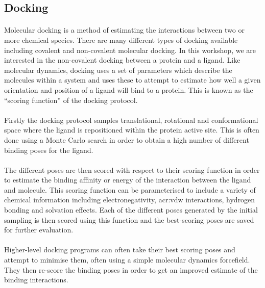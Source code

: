 \subsection{Docking}
    \paragraph{}
        Molecular docking is a method of estimating the interactions between two or more chemical species. There are many different types of docking available including covalent and non-covalent molecular docking. In this workshop, we are interested in the non-covalent docking between a protein and a ligand. Like molecular dynamics, docking uses a set of parameters which describe the molecules within a system and uses these to attempt to estimate how well a given orientation and position of a ligand will bind to a protein. This is known as the \enquote{scoring function} of the docking protocol. 
        
    \paragraph{}
Firstly the docking protocol samples translational, rotational and conformational space where the ligand is repositioned within the protein active site. This is often done using a Monte Carlo search in order to obtain a high number of different binding poses for the ligand.

    \paragraph{}
        The different poses are then scored with respect to their scoring function in order to estimate the binding affinity or energy of the interaction between the ligand and molecule. This scoring function can be parameterised to include a variety of chemical information including electronegativity, \gls{acr:vdw} interactions, hydrogen bonding and solvation effects. Each of the different poses generated by the initial sampling is then scored using this function and the best-scoring poses are saved for further evaluation. 

    \paragraph{}
        Higher-level docking programs can often take their best scoring poses and attempt to minimise them, often using a simple molecular dynamics forcefield. They then re-score the binding poses in order to get an improved estimate of the binding interactions.
    
